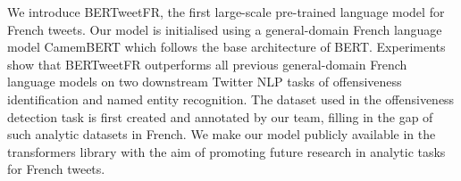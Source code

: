 We introduce BERTweetFR, the first large-scale pre-trained language model for French tweets. Our model is initialised using a general-domain French language model CamemBERT which follows the base architecture of BERT. Experiments show that BERTweetFR outperforms all previous general-domain French language models on two downstream Twitter NLP tasks of offensiveness identification and named entity recognition. The dataset used in the offensiveness detection task is first created and annotated by our team, filling in the gap of such analytic datasets in French. We make our model publicly available in the transformers library with the aim of promoting future research in analytic tasks for French tweets.
